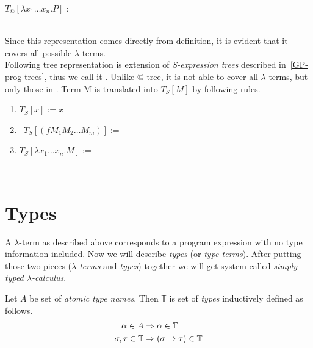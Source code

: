 \documentclass[12pt,a4paper]{report}
\makeatletter
\newcommand{\lterm}{$\lambda$-term\xspace}
\newcommand{\lterms}{$\lambda$-terms\xspace}
\newcommand{\atTree}{@-tree\xspace}
\makeatother
\begin{document}
\mbox{$T_@[\lambda x_1 \dots x_n . P] := $  } 
	
	~\\

Since this representation comes directly from definition, 
it is evident that it covers all possible \lterms.\\
 
Following tree representation is extension of 
\textit{S-expression trees} described in~\ref{GP-prog-trees},
thus we call it \textit{\sexprTree}.
Unlike \atTree, it is not able to cover all \lterms, but only those
in \bnf. 
Term M is translated into \sexprTree $T_S[M]$ by following rules.



\begin{enumerate}
    \item $T_S[x] := x$
	\item \mbox{ $T_S[(f M_1 M_2 \dots M_m)] := $ 
		 }
	\item \mbox{$T_S[\lambda x_1 \dots x_n . M] := $
	 	 }
\end{enumerate}~




\newpage
\section{Types}
\label{deftype}

\newcommand{\ar}{\rightarrow\xspace}
\newcommand{\T}{\mathbb{T}\xspace}

A \lterm as described above
corresponds to a program expression with no type information
included. Now we will describe \textit{types} (or \textit{type terms}).
After putting those two pieces 
(\textit{\lterms} and \textit{types}) together 
we will get system called \textit{simply typed $\lambda$-calculus}.


\begin{definition}
Let $A$ be set of {\it atomic type names}. 
Then $\mathbb{T}$ is set of {\it types} inductively defined as follows.
\begin{align*}
\alpha      \in A  &\then   \alpha \in \T \\
\sigma,\tau \in \T &\then ( \sigma \ar  \tau ) \in \T 
\end{align*}~

\end{definition}
\end{document}
